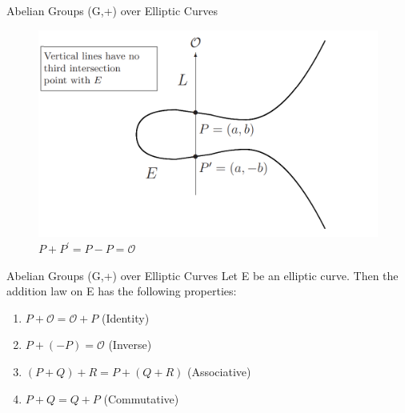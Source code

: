 \documentclass{beamer}
\begin{document}
\begin{frame}{Abelian Groups (G,+) over Elliptic Curves}
\begin{figure}

		\centering
		\includegraphics[width=1\linewidth]{P-P}
		\caption{$P+P^{\prime}=P-P=\mathcal{O}$}\label{fig:p-p}


\end{figure}
\end{frame}
\begin{frame}{Abelian Groups (G,+) over Elliptic Curves}
	Let E be an elliptic curve. Then the addition law on E has the following properties:
	\begin{enumerate}[1.]
		\item $P + \mathcal{O} = \mathcal{O} + P$ (Identity)\pause
		\item $P + (-P) = \mathcal{O}$ (Inverse)\pause
		\item $(P + Q) + R = P + (Q + R) $ (Associative)\pause
		\item $P + Q = Q + P$ (Commutative)
	\end{enumerate}

\end{frame}

%
%
\end{document}
